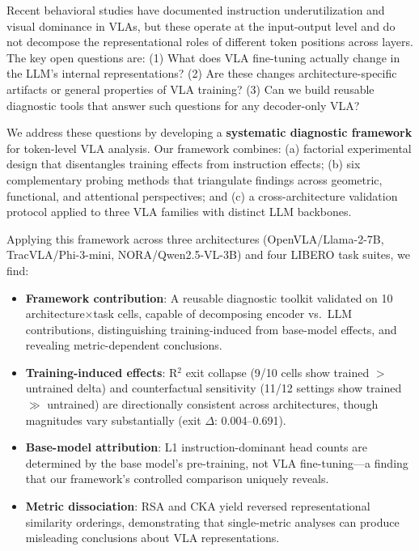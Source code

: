 \documentclass[letterpaper]{article}
\begin{document}
Recent behavioral studies have documented instruction underutilization and visual dominance in VLAs, but these operate at the input-output level and do not decompose the representational roles of different token positions across layers.
The key open questions are: (1) What does VLA fine-tuning actually change in the LLM's internal representations? (2) Are these changes architecture-specific artifacts or general properties of VLA training? (3) Can we build reusable diagnostic tools that answer such questions for any decoder-only VLA?

We address these questions by developing a \textbf{systematic diagnostic framework} for token-level VLA analysis.
Our framework combines: (a) factorial experimental design that disentangles training effects from instruction effects; (b) six complementary probing methods that triangulate findings across geometric, functional, and attentional perspectives; and (c) a cross-architecture validation protocol applied to three VLA families with distinct LLM backbones.

Applying this framework across three architectures (OpenVLA/Llama-2-7B, TracVLA/Phi-3-mini, NORA/Qwen2.5-VL-3B) and four LIBERO task suites, we find:

\begin{itemize}
    \item \textbf{Framework contribution}: A reusable diagnostic toolkit validated on 10 architecture$\times$task cells, capable of decomposing encoder vs.\ LLM contributions, distinguishing training-induced from base-model effects, and revealing metric-dependent conclusions.
    \item \textbf{Training-induced effects}: R$^2$ exit collapse (9/10 cells show trained $>$ untrained delta) and counterfactual sensitivity (11/12 settings show trained $\gg$ untrained) are directionally consistent across architectures, though magnitudes vary substantially (exit $\Delta$: 0.004--0.691).
    \item \textbf{Base-model attribution}: L1 instruction-dominant head counts are determined by the base model's pre-training, not VLA fine-tuning---a finding that our framework's controlled comparison uniquely reveals.
    \item \textbf{Metric dissociation}: RSA and CKA yield reversed representational similarity orderings, demonstrating that single-metric analyses can produce misleading conclusions about VLA representations.
\end{itemize}
\end{document}
